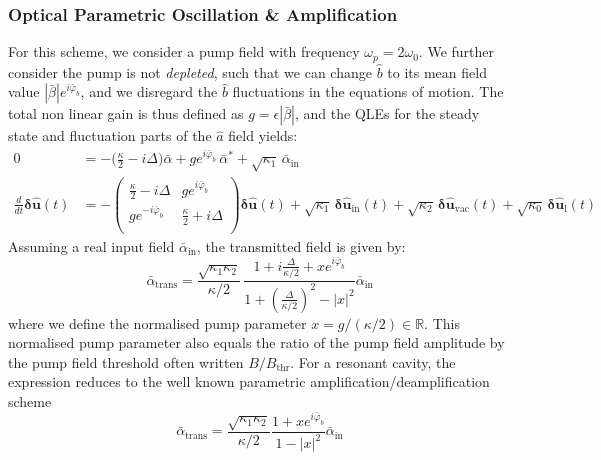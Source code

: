 \subsubsection{Optical Parametric Oscillation \& Amplification}
For this scheme, we consider a pump field with frequency $\omega_p = 2\omega_0$. We further consider the pump is not \textit{depleted}, such that we can change $\hat{b}$ to its mean field value $|\bar{\beta}|e^{i\bar{\varphi}_b}$, and we disregard the $\hat{b}$ fluctuations in the equations of motion. The total non linear gain is thus defined as $g = \epsilon |\bar\beta|$, and the QLEs for the steady state and fluctuation parts of the $\hat{a}$ field yields: 
 \begin{equation}
  \begin{split}
  0 &= -\Big(\frac{\kappa}{2}-i\Delta\Big) \bar{\alpha} +g e^{i\bar{\varphi}_b} \, \bar{\alpha}^* + \sqrt{\kappa_1} \, \bar{\alpha}_{\mathrm{in}} \\
  \frac{d}{dt} \mathbf{\delta \hat{u}}(t)&= - \begin{pmatrix}
  \frac{\kappa}{2}-i\Delta & g e^{i\bar{\varphi}_b}\\ 
   g e^{-i\bar{\varphi}_b} & \frac{\kappa}{2}+i\Delta \\ 
  \end{pmatrix}  \mathbf{\delta \hat{u}}(t) + \sqrt{\kappa_{\mathrm{1}}} \, \mathbf{\delta \hat{u}_{\mathrm{in}}}(t)  + \sqrt{\kappa_2} \, \mathbf{\delta \hat{u}_{\mathrm{vac}}}(t) + \sqrt{\kappa_0} \, \mathbf{\delta \hat{u}_{\mathrm{l}}}(t) 
  \end{split}
\end{equation}
Assuming a real input field $\bar{\alpha}_\textrm{in}$, the transmitted field is given by: 
\begin{equation}
   \bar{\alpha}_{\mathrm{trans}} = \frac{\sqrt{\kappa_1\kappa_2}}{\kappa/2} \, \frac{1+i\frac{\Delta}{\kappa/2}+xe^{i\bar{\varphi}_b}}{1+(\frac{\Delta}{\kappa/2})^2 - |x|^2}  \bar{\alpha}_\textrm{in}
\end{equation}
where we define the normalised pump parameter $x = g / (\kappa/2) \in\mathbb{R}$. This normalised pump parameter also equals the ratio of the pump field amplitude by the pump field threshold often written $B/B_{\mathrm{thr}}$. For a resonant cavity, the expression reduces to the well known parametric amplification/deamplification scheme 
\begin{equation}
   \bar{\alpha}_{\mathrm{trans}} =  \frac{\sqrt{\kappa_1\kappa_2}}{\kappa/2}\frac{1+x e^{i\bar{\varphi}_b}}{1 - |x|^2}  \bar{\alpha}_\textrm{in} 
\end{equation}

